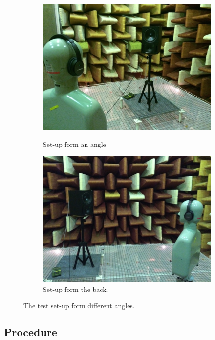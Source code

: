\begin{figure}[H]
\begin{subfigure}[b]{0.4\textwidth}
		\includegraphics[width=\textwidth]{../Journal/Experiments/TestofConsumerHeadphones/Pictures/OtherBrandsSetupAngle.jpg}
		\caption{Set-up form an angle.}
		\vspace{2ex}
		\includegraphics[width=\textwidth]{../Journal/Experiments/TestofConsumerHeadphones/Pictures/OtherBrandsSetupSide.jpg}
		\caption{Set-up form the back.}
	\end{subfigure}
	\caption{The test set-up form different angles.}
\label{fig:OtherBrandsPicture}
\end{figure}


\subsection{Procedure}
